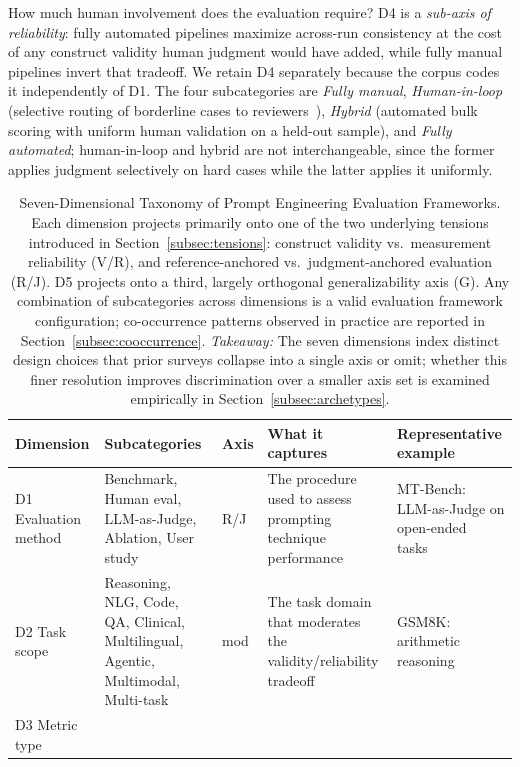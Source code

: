 \documentclass[acmsmall, nonacm, screen]{acmart}
\begin{document}
How much human involvement does the evaluation require? D4 is a
\emph{sub-axis of reliability}: fully automated pipelines maximize
across-run consistency at the cost of any construct validity human
judgment would have added, while fully manual pipelines invert that
tradeoff. We retain D4 separately because the corpus codes it
independently of D1. The four subcategories are \emph{Fully manual},
\emph{Human-in-loop} (selective routing of borderline cases to
reviewers~\cite{ouyang2022training}), \emph{Hybrid} (automated bulk
scoring with uniform human validation on a held-out sample), and
\emph{Fully automated}; human-in-loop and hybrid are not
interchangeable, since the former applies judgment selectively on
hard cases while the latter applies it uniformly.

\begin{table}[!t]
\caption{Seven-Dimensional Taxonomy of Prompt Engineering Evaluation
Frameworks. Each dimension projects primarily onto one of the two
underlying tensions introduced in Section~\ref{subsec:tensions}:
construct validity vs.\ measurement reliability (V/R), and
reference-anchored vs.\ judgment-anchored evaluation (R/J). D5
projects onto a third, largely orthogonal generalizability axis (G).
Any combination of subcategories across dimensions is a valid
evaluation framework configuration; co-occurrence patterns observed
in practice are reported in
Section~\ref{subsec:cooccurrence}.
\textit{Takeaway:} The seven dimensions index distinct design choices that prior surveys collapse into a single axis or omit; whether this finer resolution improves discrimination over a smaller axis set is examined empirically in Section~\ref{subsec:archetypes}.}
\label{tab:taxonomy}
\centering
\footnotesize
\begin{tabular}{p{1.8cm} p{2.7cm} p{0.6cm} p{3.8cm} p{3.4cm}}
\toprule
\textbf{Dimension} & \textbf{Subcategories} & \textbf{Axis} &
\textbf{What it captures} & \textbf{Representative example} \\
\midrule
D1 Evaluation method &
Benchmark, Human eval, LLM-as-Judge, Ablation, User study &
R/J &
The procedure used to assess prompting technique performance &
MT-Bench: LLM-as-Judge on open-ended tasks~\cite{zheng2023judging} \\
\midrule
D2 Task scope &
Reasoning, NLG, Code, QA, Clinical, Multilingual, Agentic, Multimodal, Multi-task &
mod &
The task domain that moderates the validity/reliability tradeoff &
GSM8K: arithmetic reasoning~\cite{wei2022chain} \\
\midrule
D3 Metric type &

\end{tabular}
\end{table}
\end{document}
